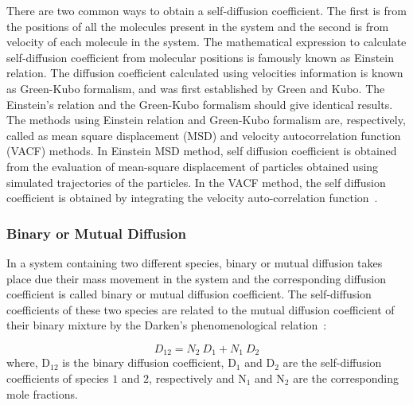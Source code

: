       There are two common ways to obtain a self-diffusion coefficient. The first is from the positions of all the molecules present in the system and the second is from velocity of each molecule in the system. The mathematical expression to calculate self-diffusion coefficient from molecular positions is famously known as Einstein relation. The diffusion coefficient calculated using velocities information is known as Green-Kubo formalism, and was first established by Green and Kubo. The Einstein's relation and the Green-Kubo formalism should give identical results. The methods using Einstein relation and  Green-Kubo formalism  are, respectively, called as mean square displacement (MSD) and velocity autocorrelation function (VACF) methods.  In Einstein MSD method, self diffusion coefficient is obtained from the evaluation of  mean-square displacement of particles obtained using simulated trajectories of the particles. In the VACF method, the self diffusion coefficient is obtained by integrating the velocity auto-correlation function~\citep{Allen1989, Frenkel2002}.     
     \subsubsection{Binary or Mutual Diffusion}
      In a system containing two different species, binary or mutual diffusion takes place
      due their mass movement in the system and the corresponding diffusion coefficient is
      called binary or mutual diffusion coefficient. The self-diffusion coefficients of these
      two species are related to the mutual diffusion coefficient of their binary mixture by
      the Darken's phenomenological relation~\citep{darken1948}:
      
      \begin{equation}
      \label{darken}
      D_{12} = N_{2}~D_{1} + N_{1}~D_{2}
      \end{equation}
     where, D$_{12}$ is the binary diffusion coefficient, D$_{1}$ and D$_{2}$ are the self-diffusion coefficients of species $1$ and $2$, respectively and   N$_{1}$  and N$_{2}$  are the corresponding mole fractions.
